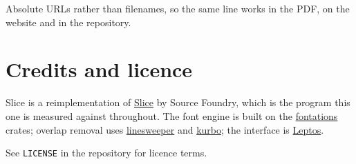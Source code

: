 \documentclass[11pt,a4paper]{article}
\begin{document}
Absolute URLs rather than filenames, so the same line works in the PDF, on the website and in the repository.

\section{Credits and licence}

Slice is a reimplementation of \href{https://github.com/source-foundry/Slice}{Slice} by Source Foundry, which is the program this one is measured against throughout. The font engine is built on the \href{https://github.com/googlefonts/fontations}{fontations} crates; overlap removal uses \href{https://crates.io/crates/linesweeper}{linesweeper} and \href{https://github.com/linebender/kurbo}{kurbo}; the interface is \href{https://leptos.dev}{Leptos}.

See \texttt{LICENSE} in the repository for licence terms.
\end{document}
